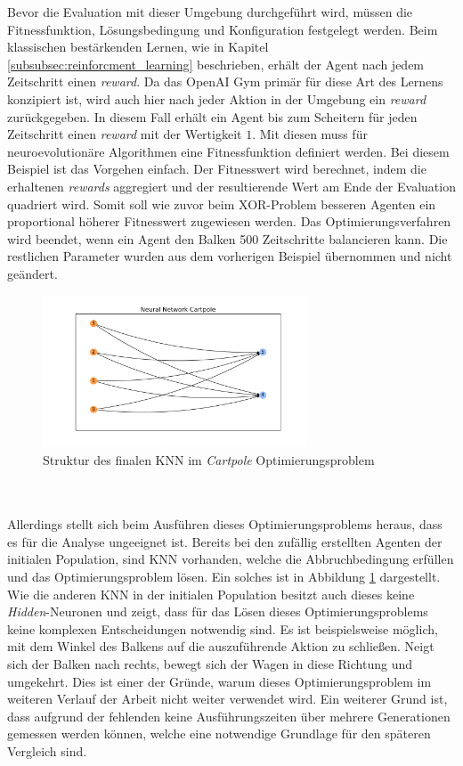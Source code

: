 Bevor die Evaluation mit dieser Umgebung durchgeführt wird, müssen die Fitnessfunktion, Lösungsbedingung und Konfiguration festgelegt werden. Beim klassischen bestärkenden Lernen, wie in Kapitel \ref{subsubsec:reinforcment_learning} beschrieben, erhält der Agent nach jedem Zeitschritt einen \emph{reward}. Da das OpenAI Gym primär für diese Art des Lernens konzipiert ist, wird auch hier nach jeder Aktion in der Umgebung ein \emph{reward} zurückgegeben. In diesem Fall erhält ein Agent bis zum Scheitern für jeden Zeitschritt einen \emph{reward} mit der Wertigkeit $1$. Mit diesen muss für neuroevolutionäre Algorithmen eine Fitnessfunktion definiert werden. Bei diesem Beispiel ist das Vorgehen einfach. Der Fitnesswert wird berechnet, indem die erhaltenen \emph{rewards} aggregiert und der resultierende Wert am Ende der Evaluation quadriert wird. Somit soll wie zuvor beim XOR-Problem besseren Agenten ein proportional höherer Fitnesswert zugewiesen werden. Das Optimierungsverfahren wird beendet, wenn ein Agent den Balken 500 Zeitschritte balancieren kann. Die restlichen Parameter wurden aus dem vorherigen Beispiel übernommen und nicht geändert.
\begin{figure}[!h]
	\centering
	\includegraphics[width=0.7\textwidth]{./img/pole_balancing_single_core/cartpole_neuroal_network.pdf} 
	\caption{Struktur des finalen KNN im \emph{Cartpole} Optimierungsproblem}
	\label{fig:cartpole_neural_network}
\end{figure}
\\\\
Allerdings stellt sich beim Ausführen dieses Optimierungsproblems heraus, dass es für die Analyse ungeeignet ist. Bereits bei den zufällig erstellten Agenten der initialen Population, sind \ac{KNN} vorhanden, welche die Abbruchbedingung erfüllen und das Optimierungsproblem lösen. Ein solches ist in Abbildung \ref{fig:cartpole_neural_network} dargestellt. Wie die anderen \ac{KNN} in der initialen Population besitzt auch dieses keine \emph{Hidden}-Neuronen und zeigt, dass für das Lösen dieses Optimierungsproblems keine komplexen Entscheidungen notwendig sind. Es ist beispielsweise möglich, mit dem Winkel des Balkens auf die auszuführende Aktion zu schließen. Neigt sich der Balken nach rechts, bewegt sich der Wagen in diese Richtung und umgekehrt. Dies ist einer der Gründe, warum dieses Optimierungsproblem im weiteren Verlauf der Arbeit nicht weiter verwendet wird. Ein weiterer Grund ist, dass aufgrund der fehlenden keine Ausführungszeiten über mehrere Generationen gemessen werden können, welche eine notwendige Grundlage für den späteren Vergleich sind.

